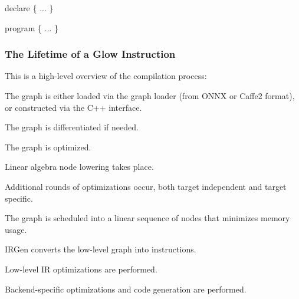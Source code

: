 \begin{DoxyCode}
declare \{
  ...
\}

program \{
  ...
\}
\end{DoxyCode}


\subsubsection*{The Lifetime of a Glow Instruction}

This is a high-\/level overview of the compilation process\+:


\begin{DoxyEnumerate}
\item The graph is either loaded via the graph loader (from O\+N\+NX or Caffe2 format), or constructed via the C++ interface.
\item The graph is differentiated if needed.
\item The graph is optimized.
\item Linear algebra node lowering takes place.
\item Additional rounds of optimizations occur, both target independent and target specific.
\item The graph is scheduled into a linear sequence of nodes that minimizes memory usage.
\item I\+R\+Gen converts the low-\/level graph into instructions.
\item Low-\/level IR optimizations are performed.
\item Backend-\/specific optimizations and code generation are performed. 
\end{DoxyEnumerate}
